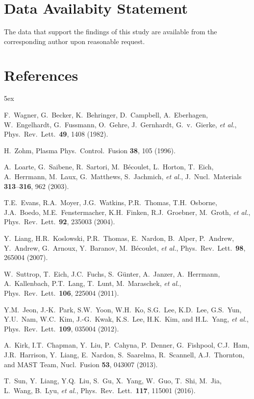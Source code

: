 \documentclass[12pt,prb,aps]{revtex4-1}
\begin{document}
\section*{Data Availabity Statement}
The data that support the findings of this study are available from the corresponding author upon reasonable request.
 
\section*{References}
\begin{thebibliography}{99}\baselineskip 5ex

 F.~Wagner, G.~Becker, K.~Behringer, D.~Campbell, A.~Eberhagen, W.~Engelhardt, G.~Fussmann, O.~Gehre, J.~Gernhardt, G.~v.~Gierke, {\it et al.}, 
Phys.\ Rev.\ Lett.\ {\bf 49}, 1408 (1982).

 H.~Zohm, Plasma Phys.\ Control.\ Fusion {\bf 38}, 105 (1996).

 A.~Loarte, G.~Saibene, R.~Sartori, M.~B\'{e}coulet, L.~Horton, T.~Eich, A.~Herrmann, M.~Laux, G.~Matthews, S.~Jachmich, {\it et al.},  
J.\ Nucl.\ Materials {\bf 313}--{\bf 316}, 962 (2003).

  T.E.~Evans, R.A.~Moyer, J.G.~Watkins, P.R.~Thomas, T.H.~Osborne, J.A.~Boedo, M.E.~Fenstermacher, K.H.~Finken, R.J.~Groebner, M.~Groth, {\it et al.},  
Phys.\ Rev.\ Lett.\ {\bf 92}, 235003 (2004).

 Y.~Liang,  H.R.~Koslowski, P.R.~Thomas, E.~Nardon, B.~Alper, P.~Andrew, Y.~Andrew, G.~Arnoux,  Y.~Baranov, M.~B\'{e}coulet, {\it et al.},  
Phys.\ Rev.\ Lett.\ {\bf 98}, 265004 (2007).

 W.~Suttrop,  T.~Eich, J.C.~Fuchs, S.~G\"{u}nter, A.~Janzer, A.~Herrmann, A.~Kallenbach, P.T.~Lang, T.~Lunt, M.~Maraschek, {\it et al.},   
Phys.\ Rev.\ Lett.\ {\bf 106}, 225004 (2011).

 Y.M.~Jeon,  J.-K.~Park, S.W.~Yoon, W.H.~Ko, S.G.~Lee, K.D.~Lee, G.S.~Yun, Y.U.~Nam, W.C.~Kim, J.-G.~Kwak, K.S.~Lee, H.K.~Kim, and H.L.~Yang, {\it et al.}, 
Phys.\ Rev.\ Lett.\ {\bf 109}, 035004 (2012).

 A.~Kirk, I.T.~Chapman, Y.~Liu, P.~Cahyna, P.~Denner, G.~Fishpool, C.J.~Ham, J.R.~Harrison, Y.~Liang, E.~Nardon, S.~Saarelma, R.~Scannell, A.J.~Thornton, and  MAST Team, 
Nucl.\  Fusion {\bf 53}, 043007 (2013).

 T.~Sun,  Y.~Liang, Y.Q.~Liu, S.~Gu, X.~Yang, W.~Guo, T.~Shi, M.~Jia, L.~Wang, B.~Lyu, {\it et al.},  
Phys.\ Rev.\ Lett.\  {\bf 117}, 115001 (2016).


\end{thebibliography}
\end{document}

